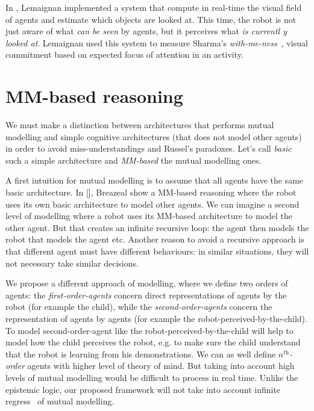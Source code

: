 \documentclass[conference]{IEEEtran}
\begin{document}
In \cite{lemaignan2016realtime}, Lemaignan implemented a system that compute in real-time the visual field of agents and estimate which objects are looked at. This time, the robot is not just aware of what \textit{can be seen} by agents, but it perceives what \textit{is currentl
y looked at}. Lemaignan used this system to measure Sharma's \textit{with-me-ness}~\cite{sharma2014me}, visual commitment based on expected focus of attention in an activity. 
\section{MM-based reasoning}

We must make a distinction between architectures that performs mutual modelling and simple cognitive architectures (that does not model other agents) in order to avoid miss-understandings and Russel's paradoxes. Let's call \textit{basic} such a simple architecture and \textit{MM-based} the mutual modelling ones. 

A first intuition for mutual modelling is to assume that all agents have the same basic architecture. In [], Breazeal show a MM-based reasoning where the robot uses its own basic architecture to model other agents. We can imagine a second level of modelling where a robot uses its MM-based architecture to model the other agent. But that creates an infinite recursive loop: the agent then models the robot that models the agent etc. Another reason to avoid a recursive approach is that different agent must have different behaviours: in similar situations, they will not necessary take similar decisions. 

We propose a different approach of modelling, where we define two orders of agents: the \textit{first-order-agents} concern direct representations of agents by the robot (for example the child), while the \textit{second-order-agents} concern the representation of agents by agents (for example the robot-perceived-by-the-child). 
To model second-order-agent like the robot-perceived-by-the-child will help to model how the child perceives the robot, e.g. to make sure the child understand that the robot is learning from his demonstrations. 
We can as well define \textit{$n^{\textit{th}}$-order} agents with higher level of theory of mind. But taking into account high levels of mutual modelling would be difficult to process in real time. Unlike the epistemic logic, our proposed framework will not take into account infinite regress~\cite{clark1991grounding} of mutual modelling.
\end{document}
